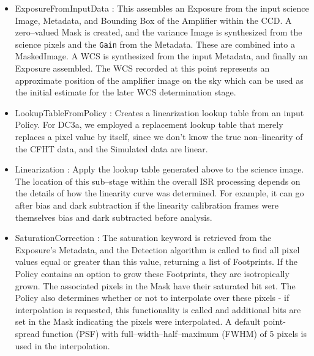 \begin{itemize}

\item ExposureFromInputData : This assembles an Exposure from the
input science Image, Metadata, and Bounding Box of the Amplifier
within the CCD.  A zero--valued Mask is created, and the variance
Image is synthesized from the science pixels and the {\tt Gain} from
the Metadata.  These are combined into a MaskedImage.  A WCS is
synthesized from the input Metadata, and finally an Exposure
assembled.  The WCS recorded at this point represents an approximate
position of the amplifier image on the sky which can be used as the
initial estimate for the later WCS determination stage.

\item LookupTableFromPolicy : Creates a linearization lookup table
from an input Policy.
For DC3a, we employed a replacement lookup table that
merely replaces a pixel value by itself, since we don't know the true
non--linearity of the CFHT data, and the Simulated data are linear.

\item Linearization : Apply the lookup table generated above to the
science image.  The location of this sub--stage within the overall ISR
processing depends on the details of how the linearity curve was
determined.  For example, it can go after bias and dark subtraction
if the linearity calibration frames were themselves bias and dark
subtracted before analysis.

\item SaturationCorrection : The saturation keyword is retrieved from
the Exposure's Metadata, and the Detection algorithm is called to find
all pixel values equal or greater than this value, returning a list of
Footprints.  If the Policy contains an option to grow these
Footprints, they are isotropically grown.  The associated pixels in
the Mask have their saturated bit set.  The Policy also determines
whether or not to interpolate over these pixels - if interpolation is
requested, this functionality is called and additional bits are set in
the Mask indicating the pixels were interpolated.  A default
point-spread function (PSF) with full--width--half--maximum (FWHM) of
5 pixels is used in the interpolation.


\end{itemize}
